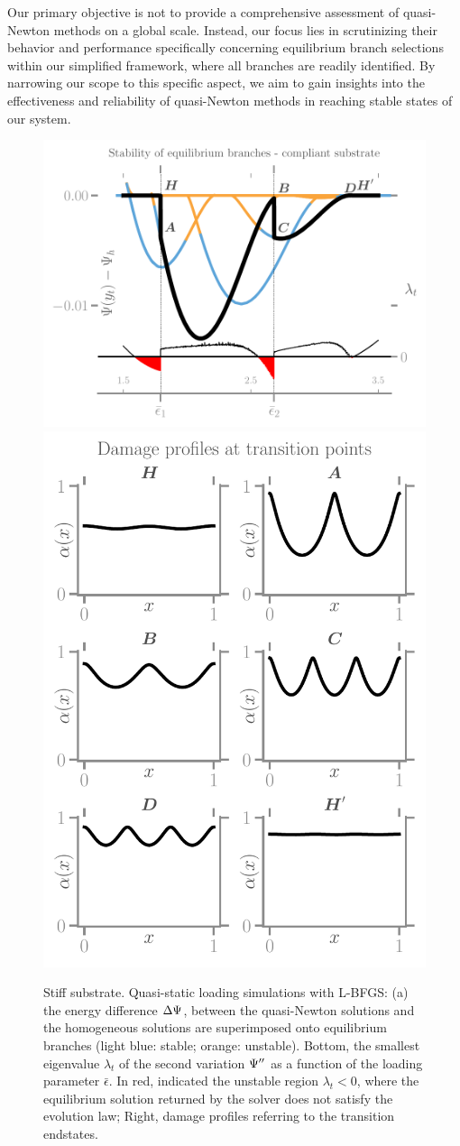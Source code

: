 \documentclass[10pt]{article}
\begin{document}
Our primary objective is not to provide a comprehensive assessment of quasi-Newton methods on a global scale. Instead, our focus lies in scrutinizing their behavior and performance specifically concerning equilibrium branch selections within our simplified framework, where all branches are readily identified. By narrowing our scope to this specific aspect, we aim to gain insights into the effectiveness and reliability of quasi-Newton methods in reaching stable states of our system.
\begin{figure}
    \centering
    \hspace*{-.3cm}
%
\includegraphics[width=.6\textwidth]{../images/model_stiff_energy_kick.pdf}
\includegraphics[width=.4\textwidth]{../images/model_stiff_profiles.pdf}
    \caption{
%
Stiff substrate. Quasi-static loading simulations with L-BFGS: (a) the energy difference $\Delta \Psi$, between the quasi-Newton solutions and the homogeneous solutions are superimposed onto equilibrium branches (light blue: stable; orange: unstable). Bottom, the smallest eigenvalue $\lambda_t$ of the second variation $\Psi''$ as a function of the loading parameter $\bar\epsilon$. In red, indicated the unstable region $\lambda_t<0$, where the equilibrium solution returned by the solver does not satisfy the evolution law; Right, damage profiles referring to the transition endstates.}
    \label{fig:tempo1}
\end{figure}
\end{document}
